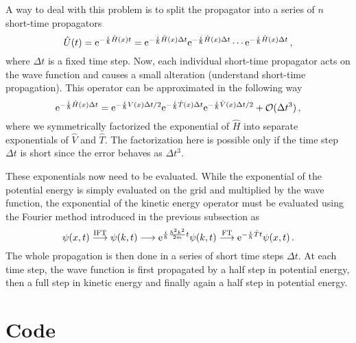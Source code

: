 A way to deal with this problem is to split the propagator into a series of $n$ short-time propagators
\begin{equation}
    \hat{U}(t) = \mathrm{e}^{-\frac{i}{\hbar}\hat{H}(x)t} = \mathrm{e}^{-\frac{i}{\hbar}\hat{H}(x)\Delta t} \mathrm{e}^{-\frac{i}{\hbar}\hat{H}(x)\Delta t} \cdots \mathrm{e}^{-\frac{i}{\hbar}\hat{H}(x)\Delta t} \, ,
    \label{eq:U4}
\end{equation}
where $\Delta t$ is a fixed time step. Now, each individual short-time propagator acts on the wave function and causes a small alteration (understand short-time propagation). This operator can be approximated in the following way
\begin{equation}
    \mathrm{e}^{-\frac{i}{\hbar}\hat{H}(x)\Delta t} = \mathrm{e}^{-\frac{i}{\hbar}V(x)\Delta t/2}\mathrm{e}^{-\frac{i}{\hbar}\hat{T}(x)\Delta t}\mathrm{e}^{-\frac{i}{\hbar}\hat{V}(x)\Delta t/2} + \mathcal{O}(\Delta t^3) \, ,
\end{equation}
where we symmetrically factorized the exponential of $\hat{H}$ into separate exponentials of $\hat{V}$ and $\hat{T}$. The factorization here is possible only if the time step $\Delta t$ is short since the error behaves as $\Delta t^3$. 

These exponentials now need to be evaluated. While the exponential of the potential energy is simply evaluated on the grid and multiplied by the wave function, the exponential of the kinetic energy operator must be evaluated using the Fourier method introduced in the previous subsection as
\begin{equation}
    \psi(x,t) \stackrel{\mathrm{IFT}}{\longrightarrow} \psi(k,t) \longrightarrow \mathrm{e}^{\frac{i}{\hbar} \frac{\hbar^2 k^2}{2m} t} \psi(k,t) \stackrel{\mathrm{FT}}{\longrightarrow} \mathrm{e}^{-\frac{i}{\hbar} \hat{T} t}\psi(x,t) \, .
\end{equation}
The whole propagation is then done in a series of short time steps $\Delta t$. At each time step, the wave function is first propagated by a half step in potential energy, then a full step in kinetic energy and finally again a half step in potential energy. 

\section{Code}

